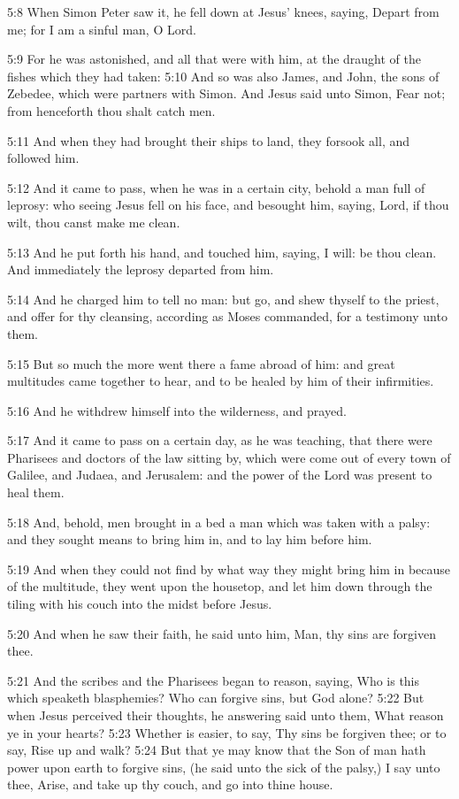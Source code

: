5:8 When Simon Peter saw it, he fell down at Jesus' knees, saying,
Depart from me; for I am a sinful man, O Lord.

5:9 For he was astonished, and all that were with him, at the draught
of the fishes which they had taken: 5:10 And so was also James, and
John, the sons of Zebedee, which were partners with Simon. And Jesus
said unto Simon, Fear not; from henceforth thou shalt catch men.

5:11 And when they had brought their ships to land, they forsook all,
and followed him.

5:12 And it came to pass, when he was in a certain city, behold a man
full of leprosy: who seeing Jesus fell on his face, and besought him,
saying, Lord, if thou wilt, thou canst make me clean.

5:13 And he put forth his hand, and touched him, saying, I will: be
thou clean. And immediately the leprosy departed from him.

5:14 And he charged him to tell no man: but go, and shew thyself to
the priest, and offer for thy cleansing, according as Moses commanded,
for a testimony unto them.

5:15 But so much the more went there a fame abroad of him: and great
multitudes came together to hear, and to be healed by him of their
infirmities.

5:16 And he withdrew himself into the wilderness, and prayed.

5:17 And it came to pass on a certain day, as he was teaching, that
there were Pharisees and doctors of the law sitting by, which were
come out of every town of Galilee, and Judaea, and Jerusalem: and the
power of the Lord was present to heal them.

5:18 And, behold, men brought in a bed a man which was taken with a
palsy: and they sought means to bring him in, and to lay him before
him.

5:19 And when they could not find by what way they might bring him in
because of the multitude, they went upon the housetop, and let him
down through the tiling with his couch into the midst before Jesus.

5:20 And when he saw their faith, he said unto him, Man, thy sins are
forgiven thee.

5:21 And the scribes and the Pharisees began to reason, saying, Who is
this which speaketh blasphemies? Who can forgive sins, but God alone?
5:22 But when Jesus perceived their thoughts, he answering said unto
them, What reason ye in your hearts?  5:23 Whether is easier, to say,
Thy sins be forgiven thee; or to say, Rise up and walk?  5:24 But that
ye may know that the Son of man hath power upon earth to forgive sins,
(he said unto the sick of the palsy,) I say unto thee, Arise, and take
up thy couch, and go into thine house.

